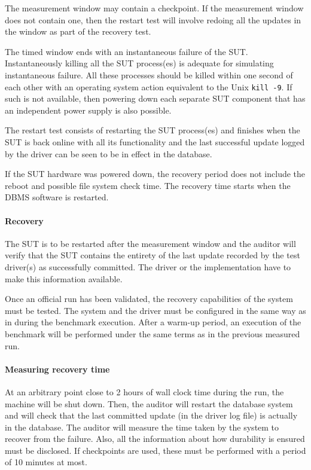 The measurement window may contain a checkpoint. If the measurement window does not contain one, then the restart test will involve redoing all the updates in the window as part of the recovery test.

The timed window ends with an instantaneous failure of the SUT. Instantaneously killing all the SUT process(es) is adequate for simulating instantaneous failure. All these processes should be killed within one second of each other with an operating system action equivalent to the Unix \verb+kill -9+. If such is not available, then powering down each separate SUT component that has an independent power supply is also possible.

The restart test consists of restarting the SUT process(es) and finishes when the SUT is back online with all its functionality and the last successful update logged by the driver can be seen to be in effect in the database.

If the SUT hardware was powered down, the recovery period does not include the reboot and possible file system check time. The recovery time starts when the DBMS software is restarted.




\paragraph{Recovery} 
The SUT is to be restarted after the measurement window and the auditor will verify that the SUT contains the entirety of the last update recorded by the test driver(s) as successfully committed. The driver or the implementation have to make this information available.

Once an official run has been validated, the recovery capabilities of the system must be tested. The system and the driver must be configured in the same way as in during the benchmark execution. After a warm-up period, an execution of the benchmark will be performed under the same terms as in the previous measured run.

\paragraph{Measuring recovery time}
At an arbitrary point close to 2 hours of wall clock time during the run, the machine will be shut down. Then, the auditor will restart the database system and will check that the last committed update (in the driver log file) is actually in the database. The auditor will measure the time taken by the system to recover from the failure. Also, all the information about how durability is ensured must be disclosed. If checkpoints are used, these must be performed with a period of 10 minutes at most.


